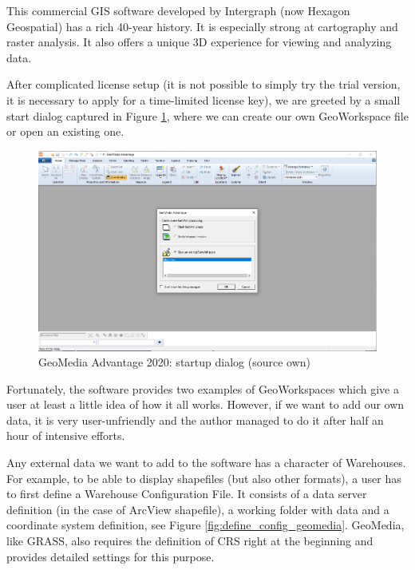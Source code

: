 \documentclass[a4paper,10pt,twoside]{article}
\begin{document}
\noindent This commercial GIS software developed by Intergraph (now Hexagon Geospatial) has a rich 40-year history. It is especially strong at cartography and raster analysis.  It also offers a unique 3D experience for viewing and analyzing data.

After complicated license setup (it is not possible to simply try the trial version, it is necessary to apply for a time-limited license key), we are greeted by a small start dialog captured in Figure \ref{fig:geomedia_startup}, where we can create our own GeoWorkspace file or open an existing one.

\vspace{0.3cm}
\begin{figure}[hbt!] 
\begin{center}
\includegraphics[width=17cm]{../pictures/geomedia_startup.png} 
\caption[GeoMedia Advantage 2020: startup dialog (source own)]{GeoMedia Advantage 2020: startup dialog (source own)}
\label{fig:geomedia_startup}
\end{center}
\end{figure}

\noindent Fortunately, the software provides two examples of GeoWorkspaces which give a user at least a little idea of how it all works. However, if we want to add our own data, it is very user-unfriendly and the author managed to do it after half an hour of intensive efforts.

Any external data we want to add to the software has a character of Warehouses. For example, to be able to display shapefiles (but also other formats), a user has to first define a Warehouse Configuration File. It consists of a data server definition (in the case of ArcView shapefile), a working folder with data and a coordinate system definition, see Figure \ref{fig:define_config_geomedia}. GeoMedia, like GRASS, also requires the definition of CRS right at the beginning and provides detailed settings for this purpose.
\end{document}
